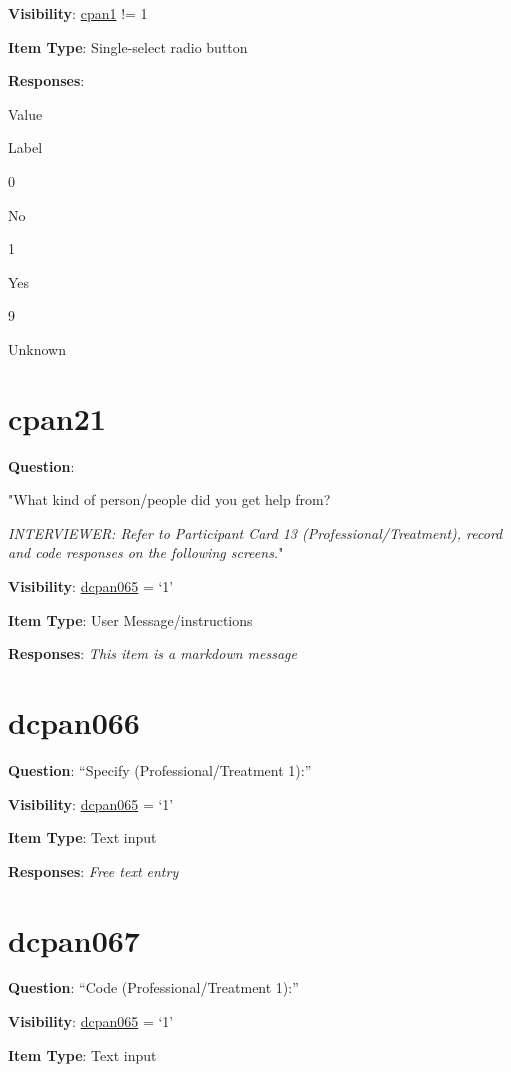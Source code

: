 \documentclass[]{book}
\begin{document}
\textbf{Visibility}: \protect\hyperlink{cpan1}{cpan1} != 1

\textbf{Item Type}: Single-select radio button

\textbf{Responses}:

Value

Label

0

No

1

Yes

9

Unknown

\hypertarget{cpan21}{%
\section{cpan21}\label{cpan21}}

\textbf{Question}:

"What kind of person/people did you get help from?

\emph{INTERVIEWER: Refer to Participant Card 13 (Professional/Treatment), record and code responses on the following screens.}"

\textbf{Visibility}: \protect\hyperlink{dcpan065}{dcpan065} = `1'

\textbf{Item Type}: User Message/instructions

\textbf{Responses}: \emph{This item is a markdown message}

\hypertarget{dcpan066}{%
\section{dcpan066}\label{dcpan066}}

\textbf{Question}: ``Specify (Professional/Treatment 1):''

\textbf{Visibility}: \protect\hyperlink{dcpan065}{dcpan065} = `1'

\textbf{Item Type}: Text input

\textbf{Responses}: \emph{Free text entry}

\hypertarget{dcpan067}{%
\section{dcpan067}\label{dcpan067}}

\textbf{Question}: ``Code (Professional/Treatment 1):''

\textbf{Visibility}: \protect\hyperlink{dcpan065}{dcpan065} = `1'

\textbf{Item Type}: Text input
\end{document}
